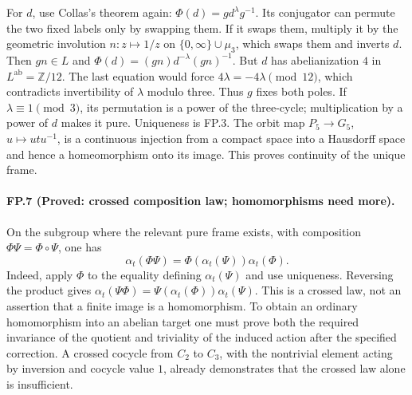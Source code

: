 For $d$, use Collas's theorem again:
$\Phi(d)=g d^\lambda g^{-1}$. Its conjugator can permute the two fixed
labels only by swapping them. If it swaps them, multiply it by the
geometric involution $n:z\mapsto1/z$ on
$\{0,\infty\}\cup\mu_3$, which swaps them and inverts $d$.
Then $gn\in L$ and $\Phi(d)=(gn)d^{-\lambda}(gn)^{-1}$.
But $d$ has abelianization $4$ in $L^{\mathrm{ab}}=\mathbb Z/12$.
The last equation would force $4\lambda=-4\lambda\pmod{12}$, which
contradicts invertibility of $\lambda$ modulo three. Thus $g$ fixes both
poles. If $\lambda\equiv1\pmod3$, its permutation is a power of the
three-cycle; multiplication by a power of $d$ makes it pure.
Uniqueness is FP.3. The orbit map $P_5\to G_5$,
$u\mapsto utu^{-1}$, is a continuous injection from a compact space into a
Hausdorff space and hence a homeomorphism onto its image. This proves
continuity of the unique frame.

\paragraph{FP.7 (Proved: crossed composition law; homomorphisms need more).}
On the subgroup where the relevant pure frame exists, with composition
$\Phi\Psi=\Phi\circ\Psi$, one has
\[
 \alpha_t(\Phi\Psi)=\Phi(\alpha_t(\Psi))\alpha_t(\Phi).
\]
Indeed, apply $\Phi$ to the equality defining $\alpha_t(\Psi)$ and use
uniqueness. Reversing the product gives
$\alpha_t(\Psi\Phi)=\Psi(\alpha_t(\Phi))\alpha_t(\Psi)$.
This is a crossed law, not an assertion that a finite image is a
homomorphism. To obtain an ordinary homomorphism into an abelian target one
must prove both the required invariance of the quotient and triviality of
the induced action after the specified correction. A crossed cocycle from
$C_2$ to $C_3$, with the nontrivial element acting by inversion and cocycle
value $1$, already demonstrates that the crossed law alone is insufficient.

